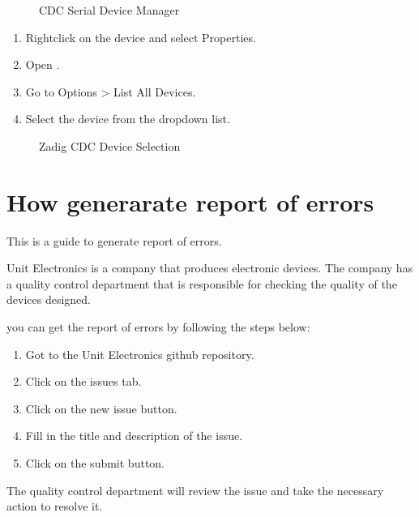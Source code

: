 \documentclass[letterpaper,10pt,english]{sphinxmanual}
\begin{document}
\begin{figure}[htbp]
\centering
\capstart

\noindent{}
\caption{CDC Serial Device Manager}\label{\detokenize{cdc:id1}}\label{\detokenize{cdc:figura-device-manager}}\end{figure}
\begin{enumerate}
%
\setcounter{enumi}{1}
\item {} 
\sphinxAtStartPar
Right\sphinxhyphen{}click on the device and select Properties.

\item {} 
\sphinxAtStartPar
Open .

\item {} 
\sphinxAtStartPar
Go to Options \textgreater{} List All Devices.

\item {} 
\sphinxAtStartPar
Select the device from the drop\sphinxhyphen{}down list.

\end{enumerate}

\begin{figure}[htbp]
\centering
\capstart

\noindent{}
\caption{Zadig CDC Device Selection}\label{\detokenize{cdc:id2}}\label{\detokenize{cdc:figura-zadig}}\end{figure}

\sphinxstepscope


\chapter{How generarate report of errors}
\label{\detokenize{report:how-generarate-report-of-errors}}\label{\detokenize{report::doc}}
\sphinxAtStartPar
This is a guide to generate report of errors.

\sphinxAtStartPar
Unit Electronics is a company that produces electronic devices. The company has a quality control
department that is responsible for checking the quality of the devices designed.

\sphinxAtStartPar
you can get the report of errors by following the steps below:
\begin{enumerate}
%
\item {} 
\sphinxAtStartPar
Got to the Unit Electronics github repository.

\item {} 
\sphinxAtStartPar
Click on the issues tab.

\item {} 
\sphinxAtStartPar
Click on the new issue button.

\item {} 
\sphinxAtStartPar
Fill in the title and description of the issue.

\item {} 
\sphinxAtStartPar
Click on the submit button.

\end{enumerate}

\sphinxAtStartPar
The quality control department will review the issue and take the necessary action to resolve it.



\renewcommand{\indexname}{Index}
\printindex
\end{document}
